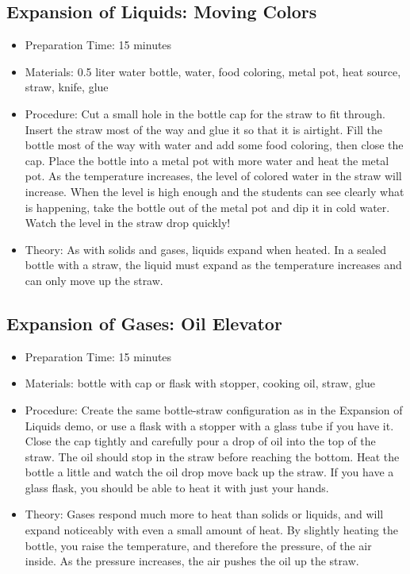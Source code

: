 \subsection{Expansion of Liquids: Moving Colors}
\begin{itemize}
\item{Preparation Time: 15 minutes}
\item{Materials: 0.5 liter water bottle, water, food coloring, metal pot, heat source, straw, knife, glue}
\item{Procedure: Cut a small hole in the bottle cap for the straw to fit through. Insert the straw most of the way and glue it so that it is airtight. Fill the bottle most of the way with water and add some food coloring, then close the cap. Place the bottle into a metal pot with more water and heat the metal pot. As the temperature increases, the level of colored water in the straw will increase. When the level is high enough and the students can see clearly what is happening, take the bottle out of the metal pot and dip it in cold water. Watch the level in the straw drop quickly!}
\item{Theory: As with solids and gases, liquids expand when heated. In a sealed bottle with a straw, the liquid must expand as the temperature increases and can only move up the straw.}
\end{itemize}

\subsection{Expansion of Gases: Oil Elevator}
\begin{itemize}
\item{Preparation Time: 15 minutes}
\item{Materials: bottle with cap or flask with stopper, cooking oil, straw, glue}
\item{Procedure: Create the same bottle-straw configuration as in the Expansion of Liquids demo, or use a flask with a stopper with a glass tube if you have it. Close the cap tightly and carefully pour a drop of oil into the top of the straw. The oil should stop in the straw before reaching the bottom. Heat the bottle a little and watch the oil drop move back up the straw. If you have a glass flask, you should be able to heat it with just your hands.}
\item{Theory: Gases respond much more to heat than solids or liquids, and will expand noticeably with even a small amount of heat. By slightly heating the bottle, you raise the temperature, and therefore the pressure, of the air inside. As the pressure increases, the air pushes the oil up the straw.}
\end{itemize}

